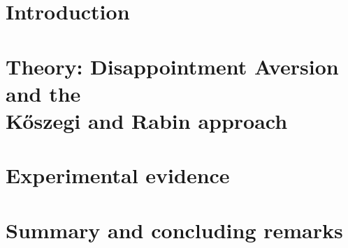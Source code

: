 \documentclass[12pt]{article}
\begin{document}



% 



\section{Introduction}

  

\section{Theory: Disappointment Aversion and the \\ Kőszegi and Rabin approach}

  

\section{Experimental evidence}

  


\section{Summary and concluding remarks}

  





\clearpage
\end{document}
